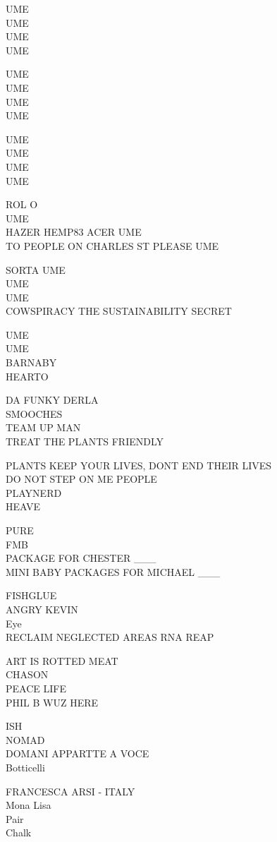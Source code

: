\documentclass[10pt,letterpaper]{article}
\begin{document}
UME\\
UME\\
UME\\
UME

UME\\
UME\\
UME\\
UME

UME\\
UME\\
UME\\
UME

ROL O\\
UME\\
HAZER HEMP83 ACER UME\\
TO PEOPLE ON CHARLES ST PLEASE UME

SORTA UME\\
UME\\
UME\\
COWSPIRACY THE SUSTAINABILITY SECRET

UME\\
UME\\
BARNABY\\
HEARTO

DA FUNKY DERLA\\
SMOOCHES\\
TEAM UP MAN\\
TREAT THE PLANTS FRIENDLY

PLANTS KEEP YOUR LIVES, DONT END THEIR LIVES\\
DO NOT STEP ON ME PEOPLE\\
PLAYNERD\\
HEAVE

PURE\\
FMB\\
PACKAGE FOR CHESTER \_\_\_\\
MINI BABY PACKAGES FOR MICHAEL \_\_\_

FISHGLUE\\
ANGRY KEVIN\\
Eye\\
RECLAIM NEGLECTED AREAS RNA REAP

ART IS ROTTED MEAT\\
CHASON\\
PEACE LIFE\\
PHIL B WUZ HERE

ISH\\
NOMAD\\
DOMANI APPARTTE A VOCE\\
Botticelli

FRANCESCA ARSI {-} ITALY\\
Mona Lisa\\
Pair\\
Chalk
\end{document}
